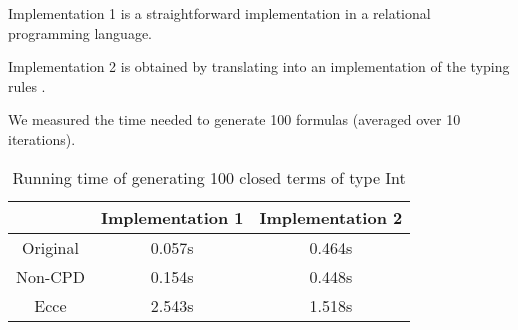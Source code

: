 Implementation 1 is a straightforward implementation in a relational programming language.

Implementation 2 is obtained by translating into \mk{} an implementation of the typing rules \ocaml{}.

We measured the time needed to generate 100 formulas (averaged over 10 iterations).

\begin{table}
  \centering
  \begin{tabular}{c||c||c}
              & Implementation 1 & Implementation 2 \\
  \hline\hline
  Original    & 0.057s & 0.464s\\
  \hline
  Non-CPD     & 0.154s & 0.448s \\
  \hline
  Ecce        & 2.543s  & 1.518s \\
  \end{tabular}

  \caption{Running time of generating 100 closed terms of type Int}
  \label{tbl:eval}
\end{table}